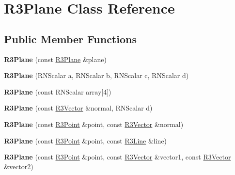 \hypertarget{class_r3_plane}{}\section{R3\+Plane Class Reference}
\label{class_r3_plane}
\subsection*{Public Member Functions}
\begin{DoxyCompactItemize}
\item 
{\bfseries R3\+Plane} (const \hyperlink{class_r3_plane}{R3\+Plane} \&plane)\hypertarget{class_r3_plane_a0766834a9a90055513a25e57840cc107}{}\label{class_r3_plane_a0766834a9a90055513a25e57840cc107}

\item 
{\bfseries R3\+Plane} (R\+N\+Scalar a, R\+N\+Scalar b, R\+N\+Scalar c, R\+N\+Scalar d)\hypertarget{class_r3_plane_ab606e42953d1a0be357d9790378e8c59}{}\label{class_r3_plane_ab606e42953d1a0be357d9790378e8c59}

\item 
{\bfseries R3\+Plane} (const R\+N\+Scalar array\mbox{[}4\mbox{]})\hypertarget{class_r3_plane_a4c176d59f3f6aebe0e2b931544a1733b}{}\label{class_r3_plane_a4c176d59f3f6aebe0e2b931544a1733b}

\item 
{\bfseries R3\+Plane} (const \hyperlink{class_r3_vector}{R3\+Vector} \&normal, R\+N\+Scalar d)\hypertarget{class_r3_plane_aacdb37ac981b279a1f163e979f1e6c9f}{}\label{class_r3_plane_aacdb37ac981b279a1f163e979f1e6c9f}

\item 
{\bfseries R3\+Plane} (const \hyperlink{class_r3_point}{R3\+Point} \&point, const \hyperlink{class_r3_vector}{R3\+Vector} \&normal)\hypertarget{class_r3_plane_a705cb1dca4bcb9be98700096eb0c18a4}{}\label{class_r3_plane_a705cb1dca4bcb9be98700096eb0c18a4}

\item 
{\bfseries R3\+Plane} (const \hyperlink{class_r3_point}{R3\+Point} \&point, const \hyperlink{class_r3_line}{R3\+Line} \&line)\hypertarget{class_r3_plane_a05813a333c2eb072f8f0df5f9fc3f633}{}\label{class_r3_plane_a05813a333c2eb072f8f0df5f9fc3f633}

\item 
{\bfseries R3\+Plane} (const \hyperlink{class_r3_point}{R3\+Point} \&point, const \hyperlink{class_r3_vector}{R3\+Vector} \&vector1, const \hyperlink{class_r3_vector}{R3\+Vector} \&vector2)\hypertarget{class_r3_plane_a043c054a6c3700be708ae8c2835a5764}{}\label{class_r3_plane_a043c054a6c3700be708ae8c2835a5764}


\end{DoxyCompactItemize}
